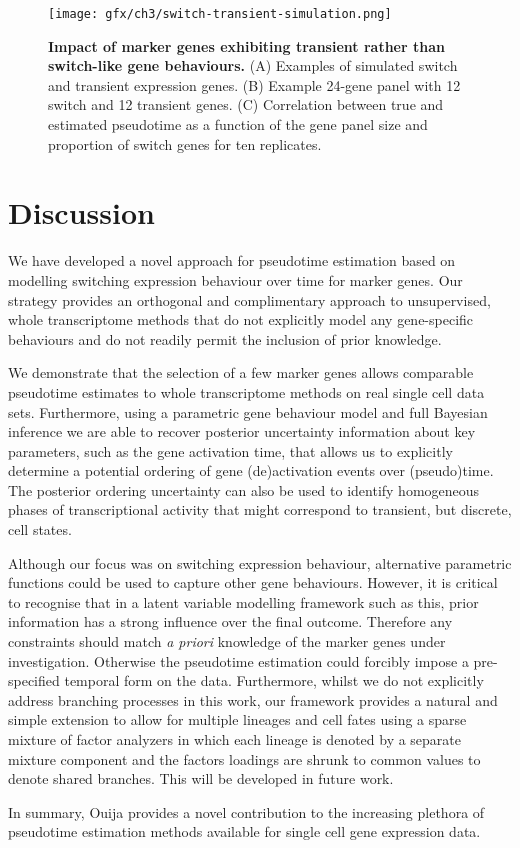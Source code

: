 \begin{figure}[!t]
	\texttt{[image: gfx/ch3/switch-transient-simulation.png]}
	\caption{{\bf Impact of marker genes exhibiting transient rather than switch-like gene behaviours.} (A) Examples of simulated switch and transient expression genes. (B) Example 24-gene panel with 12 switch and 12 transient genes. (C) Correlation between true and estimated pseudotime as a function of the gene panel size and proportion of switch genes for ten replicates.}
	\label{fig:switch-transient-simulation}
\end{figure}

\section{Discussion}

We have developed a novel approach for pseudotime estimation based on modelling switching expression behaviour over time for marker genes. Our strategy provides an orthogonal and complimentary approach to unsupervised, whole transcriptome methods that do not explicitly model any gene-specific behaviours and do not readily permit the inclusion of prior knowledge.

We demonstrate that the selection of a few marker genes allows comparable pseudotime estimates to whole transcriptome methods on real single cell data sets. Furthermore, using a parametric gene behaviour model and full Bayesian inference we are able to recover posterior uncertainty information about key parameters, such as the gene activation time, that allows us to explicitly determine a potential ordering of gene (de)activation events over (pseudo)time. The posterior ordering uncertainty can also be used to identify homogeneous phases of transcriptional activity that might correspond to transient, but discrete, cell states.

Although our focus was on switching expression behaviour, alternative parametric functions could be used to capture other gene behaviours. However, it is critical to recognise that in a latent variable modelling framework such as this, prior information has a strong influence over the final outcome. Therefore any constraints should match \emph{a priori} knowledge of the marker genes under investigation. Otherwise the pseudotime estimation could forcibly impose a pre-specified temporal form on the data. Furthermore, whilst we do not explicitly address branching processes in this work, our framework provides a natural and simple extension to allow for multiple lineages and cell fates using a sparse mixture of factor analyzers in which each lineage is denoted by a separate mixture component and the factors loadings are shrunk to common values to denote shared branches. This will be developed in future work.

In summary, Ouija provides a novel contribution to the increasing plethora of pseudotime estimation methods available for single cell gene expression data.
